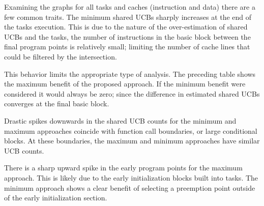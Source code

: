 %
%
%
%
%
%
%

Examining the graphs for all tasks and caches (instruction and data)
there are a few common traits. The minimum shared UCBs sharply
increases at the end of the tasks execution. This is due to the nature
of the over-estimation of shared UCBs and the tasks, the number of
instructions in the basic block between the final program points is
relatively small; limiting the number of cache lines that could be
filtered by the intersection.

This behavior limits the appropriate type of analysis. The preceding
table shows the maximum benefit of the proposed approach. If the
minimum benefit were considered it would always be zero; since the
difference in estimated shared UCBs converges at the final basic
block.

Drastic spikes downwards in the shared UCB counts for the minimum and
maximum approaches coincide with function call boundaries, or large
conditional blocks. At these boundaries, the maximum and minimum
approaches have similar UCB counts.

There is a sharp upward spike in the early program points for the
maximum approach. This is likely due to the early initialization
blocks built into tasks. The minimum approach shows a clear benefit of
selecting a preemption point outside of the early initialization
section.
\vspace{-10pt}
